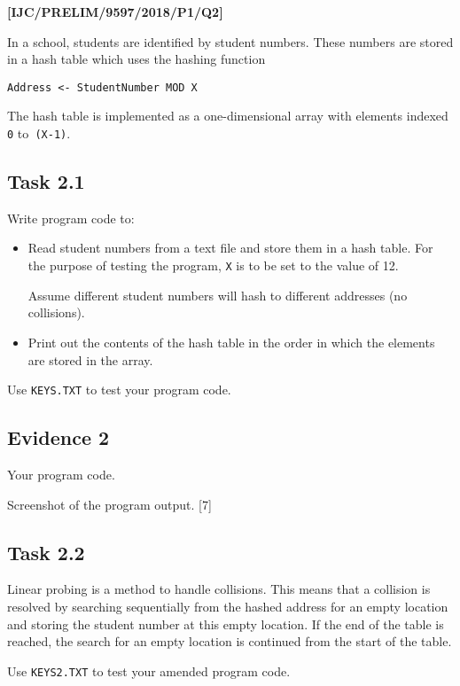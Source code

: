 \item \textbf{{[}IJC/PRELIM/9597/2018/P1/Q2{]} }

In a school, students are identified by student numbers. These numbers
are stored in a hash table which uses the hashing function 
\noindent \begin{center}
\texttt{Address <- StudentNumber MOD X }
\par\end{center}

The hash table is implemented as a one-dimensional array with elements
indexed \texttt{0} to\texttt{ (X-1)}. 

\subsection*{Task 2.1}

Write program code to: 
\begin{itemize}
\item Read student numbers from a text file and store them in a hash table.
For the purpose of testing the program, \texttt{X} is to be set to
the value of 12. 

Assume different student numbers will hash to different addresses
(no collisions).
\item Print out the contents of the hash table in the order in which the
elements are stored in the array.
\end{itemize}
Use \texttt{KEYS.TXT} to test your program code.

\subsection*{Evidence 2}

Your program code. 

Screenshot of the program output. \hfill{}{[}7{]}

\subsection*{Task 2.2 }

Linear probing is a method to handle collisions. This means that a
collision is resolved by searching sequentially from the hashed address
for an empty location and storing the student number at this empty
location. If the end of the table is reached, the search for an empty
location is continued from the start of the table.

Use \texttt{KEYS2.TXT} to test your amended program code.


